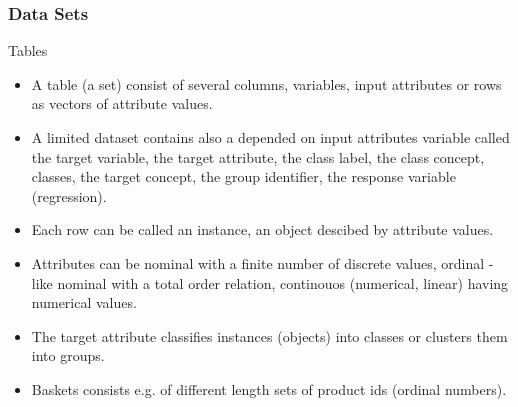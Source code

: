 \documentclass[proffesionalfonts]{beamer}
\begin{document}
\begin{frame}
\frametitle{Data Sets}
\begin{block}{Tables}
\begin{itemize}
\item A table (a set) consist of several columns, variables, input attributes or rows as vectors of attribute values.
\item A limited dataset contains also a depended on input attributes variable called the target variable, the target attribute, the class label, the class concept, classes, the target concept, the group identifier, the response variable (regression).
\item Each row can be called an instance, an object descibed by attribute values.
\item Attributes can be nominal with a finite number of discrete values, ordinal - like nominal with a total order relation, continouos (numerical, linear) having numerical values.
\item The target attribute classifies instances (objects) into classes or clusters them into groups.
\end{itemize}
\end{block}
\scriptsize
\begin{block}{}
\begin{itemize}
\item Baskets consists e.g. of different length sets of product ids (ordinal numbers).
\end{itemize}
\end{block}
\end{frame}
\end{document}
